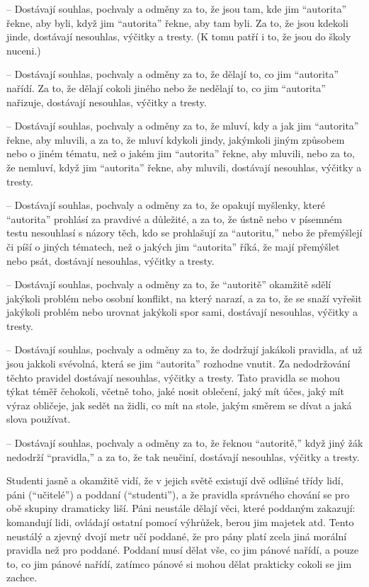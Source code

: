 \documentclass{book}
\begin{document}
-- Dostávají souhlas, pochvaly a odměny za to, že jsou tam, kde jim \enquote{autorita} řekne, aby byli, když jim \enquote{autorita} řekne, aby tam byli. Za to, že jsou kdekoli jinde, dostávají nesouhlas, výčitky a tresty. (K tomu patří i to, že jsou do školy nuceni.)

-- Dostávají souhlas, pochvaly a odměny za to, že dělají to, co jim \enquote{autorita} nařídí. Za to, že dělají cokoli jiného nebo že nedělají to, co jim \enquote{autorita} nařizuje, dostávají nesouhlas, výčitky a tresty.

-- Dostávají souhlas, pochvaly a odměny za to, že mluví, kdy a jak jim \enquote{autorita} řekne, aby mluvili, a za to, že mluví kdykoli jindy, jakýmkoli jiným způsobem nebo o jiném tématu, než o jakém jim \enquote{autorita} řekne, aby mluvili, nebo za to, že nemluví, když jim \enquote{autorita} řekne, aby mluvili, dostávají nesouhlas, výčitky a tresty.

-- Dostávají souhlas, pochvaly a odměny za to, že opakují myšlenky, které \enquote{autorita} prohlásí za pravdivé a důležité, a za to, že ústně nebo v písemném testu nesouhlasí s názory těch, kdo se prohlašují za \enquote{autoritu,} nebo že přemýšlejí či píší o jiných tématech, než o jakých jim \enquote{autorita} říká, že mají přemýšlet nebo psát, dostávají nesouhlas, výčitky a tresty.

-- Dostávají souhlas, pochvaly a odměny za to, že \enquote{autoritě} okamžitě sdělí jakýkoli problém nebo osobní konflikt, na který narazí, a za to, že se snaží vyřešit jakýkoli problém nebo urovnat jakýkoli spor sami, dostávají nesouhlas, výčitky a tresty.

-- Dostávají souhlas, pochvaly a odměny za to, že dodržují jakákoli pravidla, ať už jsou jakkoli svévolná, která se jim \enquote{autorita} rozhodne vnutit. Za nedodržování těchto pravidel dostávají nesouhlas, výčitky a tresty. Tato pravidla se mohou týkat téměř čehokoli, včetně toho, jaké nosit oblečení, jaký mít účes, jaký mít výraz obličeje, jak sedět na židli, co mít na stole, jakým směrem se dívat a jaká slova používat.

-- Dostávají souhlas, pochvaly a odměny za to, že řeknou \enquote{autoritě,} když jiný žák nedodrží \enquote{pravidla,} a za to, že tak neučiní, dostávají nesouhlas, výčitky a tresty.

Studenti jasně a okamžitě vidí, že v jejich světě existují dvě odlišné třídy lidí, páni (\enquote{učitelé}) a poddaní (\enquote{studenti}), a že pravidla správného chování se pro obě skupiny dramaticky liší. Páni neustále dělají věci, které poddaným zakazují: komandují lidi, ovládají ostatní pomocí výhrůžek, berou jim majetek atd. Tento neustálý a zjevný dvojí metr učí poddané, že pro pány platí zcela jiná morální pravidla než pro poddané. Poddaní musí dělat vše, co jim pánové nařídí, a pouze to, co jim pánové nařídí, zatímco pánové si mohou dělat prakticky cokoli se jim zachce.
\end{document}
